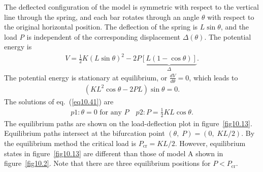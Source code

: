 \documentclass{AeroStructure-ERJohnson}
\begin{document}
The deflected configuration of the model is symmetric with respect to the vertical line through the spring, and each bar rotates through an angle $\theta$ with respect to the original horizontal position. The deflection of the spring is $L \sin \theta$, and the load \textit{P} is independent of the corresponding displacement $\Delta(\theta)$. The potential energy is
\begin{align}\label{eq10.40}
V=\frac{1}{2} K(L \sin \theta)^{2}-2 P \underbrace{[L(1-\cos \theta)]}_{\Delta}.
\end{align}
The potential energy is stationary at equilibrium, or $\frac{d V}{d \theta}=0$, which leads to
\begin{align}\label{eq10.41}
(K L^{2} \cos \theta-2 P L) \sin \theta=0.
\end{align}
The solutions of eq.~(\ref{eq10.41}) are
\begin{align}\label{eq10.42}
p 1: \theta=0 \text { for any } P \quad p 2: P=\frac{1}{2} K L \cos \theta.
\end{align}
The equilibrium paths are shown on the load-deflection plot in figure~\ref{fig10.13}. Equilibrium paths intersect at the bifurcation point $(\theta,\; P)=(0,\; \textit{KL}/2)$. By the equilibrium method the critical load is $P_{\mathrm{cr}}=K L / 2$. However, equilibrium states in figure~\ref{fig10.13} are different than those of model A shown in figure~\ref{fig10.2}. Note that there are three equilibrium positions for $P<P_{\mathrm{cr}}$.

{\def\thefigure{10.13}
}
\end{document}
